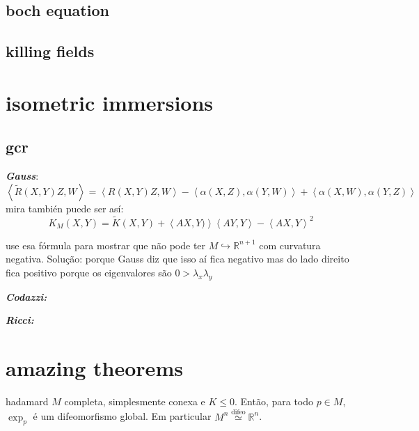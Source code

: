 \subsection{boch equation}

\subsection{killing fields}

\section{isometric immersions}

\subsection{gcr}
\textit{\textbf{Gauss}}:
\[\left<\tilde{R}(X,Y)Z,W\right>=\left<R(X,Y)Z,W\right>-\left<\alpha(X,Z),\alpha(Y,W)\right>+\left<\alpha(X,W),\alpha(Y,Z)\right>\]
mira también puede ser así:
\[K_M(X,Y)=\tilde{K}(X,Y)+\left<AX,Y)\right>\left<AY,Y\right>-\left<AX,Y\right>^2\]
\begin{exercise}\leavevmode
use esa fórmula para mostrar que não pode ter \(M \hookrightarrow \mathbb{R}^{n+1}\) com curvatura negativa. Solução: porque Gauss diz que isso aí fica negativo mas do lado direito fica positivo porque os eigenvalores são \(0>\lambda_x\lambda_y\)
\end{exercise}

\textit{\textbf{Codazzi:}}

 \textit{\textbf{Ricci:}}

\section{amazing theorems}

\begin{thing6}{hadamard}\leavevmode
\(M\) completa, simplesmente conexa e \(K \leq  0\). Então, para todo \(p \in M\), \(\operatorname{exp}_p\) é um difeomorfismo global. Em particular \(M^n \overset{\operatorname{difeo}}{\simeq} \mathbb{R}^n\).
\end{thing6}

